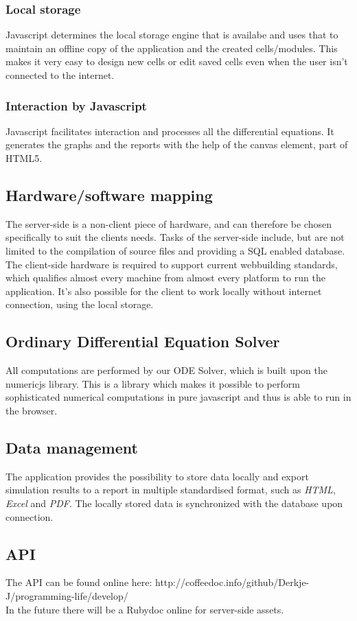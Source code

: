 \documentclass{report}
\begin{document}
				\subsubsection{Local storage}
					Javascript determines the local storage engine that is availabe and uses that to maintain an offline copy of the application and the created cells/modules. This makes it very easy to design new cells or edit saved cells even when the user isn't connected to the internet.
				\subsubsection{Interaction by Javascript}
					Javascript facilitates interaction and processes all the differential equations. It generates the graphs and the reports with the help of the canvas element, part of HTML5.

		\subsection{Hardware/software mapping}
			The server-side is a non-client piece of hardware, and can therefore be chosen specifically to suit the clients needs. Tasks of the server-side include, but are not limited to the compilation of source files and providing a SQL enabled database. The client-side hardware is required to support current webbuilding standards, which qualifies almost every machine from almost every platform to run the application. It's also possible for the client to work locally without internet connection, using the local storage.\\
		\subsection{Ordinary Differential Equation Solver}
			All computations are performed by our ODE Solver, which is built upon the numericjs library. This is a library which makes it possible to perform sophisticated numerical computations in pure javascript and thus is able to run in the browser.
		\subsection{Data management}
			The application provides the possibility to store data locally and export simulation results to a report in multiple standardised format, such as \emph{HTML}, \emph{Excel} and \emph{PDF}.
			The locally stored data is synchronized with the database upon connection. 	
		\subsection{API}
			The API can be found online here: http://coffeedoc.info/github/Derkje-J/programming-life/develop/ \\
			In the future there will be a Rubydoc online for server-side assets.
	
\end{document}
